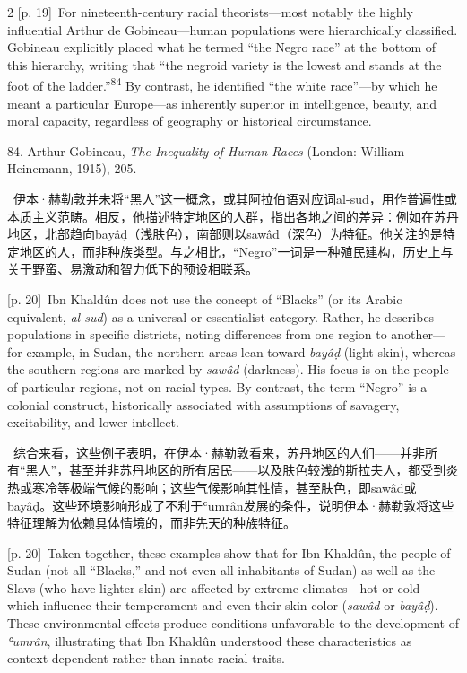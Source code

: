 \documentclass[10pt,a4paper]{article}
\begin{document}
\begin{paracol}{2}
\switchcolumn
{\scriptsize\color{gray} [p. 19]}\ For nineteenth-century racial theorists—most notably the highly influential Arthur de Gobineau—human populations were hierarchically classified. Gobineau explicitly placed what he termed “the Negro race” at the bottom of this hierarchy, writing that “the negroid variety is the lowest and stands at the foot of the ladder.”\nobreak\textsuperscript{84} By contrast, he identified “the white race”—by which he meant a particular Europe—as inherently superior in intelligence, beauty, and moral capacity, regardless of geography or historical circumstance.\par{\small 84. Arthur Gobineau, \textit{The Inequality of Human Races} (London: William Heinemann, 1915), 205.\par}
\switchcolumn*
{\scriptsize\color{gray} [p. 20]}\ 伊本·赫勒敦并未将“黑人”这一概念，或其阿拉伯语对应词al-sud，用作普遍性或本质主义范畴。相反，他描述特定地区的人群，指出各地之间的差异：例如在苏丹地区，北部趋向bayâḍ（浅肤色），南部则以sawâd（深色）为特征。他关注的是特定地区的人，而非种族类型。与之相比，“Negro”一词是一种殖民建构，历史上与关于野蛮、易激动和智力低下的预设相联系。\par
\switchcolumn
{\scriptsize\color{gray} [p. 20]}\ Ibn Khaldûn does not use the concept of “Blacks” (or its Arabic equivalent, \textit{al-sud}) as a universal or essentialist category. Rather, he describes populations in specific districts, noting differences from one region to another—for example, in Sudan, the northern areas lean toward \textit{bayâḍ} (light skin), whereas the southern regions are marked by \textit{sawâd} (darkness). His focus is on the people of particular regions, not on racial types. By contrast, the term “Negro” is a colonial construct, historically associated with assumptions of savagery, excitability, and lower intellect.\par
\switchcolumn*
{\scriptsize\color{gray} [p. 20]}\ 综合来看，这些例子表明，在伊本·赫勒敦看来，苏丹地区的人们——并非所有“黑人”，甚至并非苏丹地区的所有居民——以及肤色较浅的斯拉夫人，都受到炎热或寒冷等极端气候的影响；这些气候影响其性情，甚至肤色，即sawâd或bayâḍ。这些环境影响形成了不利于ʿumrân发展的条件，说明伊本·赫勒敦将这些特征理解为依赖具体情境的，而非先天的种族特征。\par
\switchcolumn
{\scriptsize\color{gray} [p. 20]}\ Taken together, these examples show that for Ibn Khaldûn, the people of Sudan (not all “Blacks,” and not even all inhabitants of Sudan) as well as the Slavs (who have lighter skin) are affected by extreme climates—hot or cold—which influence their temperament and even their skin color (\textit{sawâd} or \textit{bayâḍ}). These environmental effects produce conditions unfavorable to the development of \textit{ʿumrân}, illustrating that Ibn Khaldûn understood these characteristics as context-dependent rather than innate racial traits.\par

\end{paracol}
\end{document}
